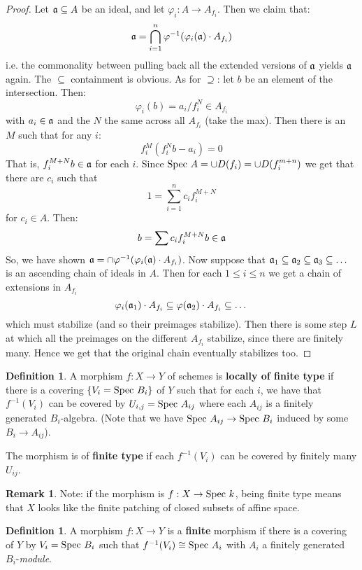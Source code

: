 \documentclass[10pt,reqno]{amsart}
\theoremstyle{definition}
\newtheorem{definition}[theorem]{Definition}
\newtheorem{remark}[theorem]{Remark}
\theoremstyle{remark}
\numberwithin{equation}{section}
\numberwithin{theorem}{section}
\newcommand{\spec}{\textup{Spec }}
\newcommand{\fraka}{\frak{a}}
\begin{document}
\begin{proof}
Let $\fraka \subseteq A$ be an ideal, and let $\varphi_i: A \to A_{f_i}$. Then we claim that:
\[\frak{a} = \bigcap_{i=1}^n \varphi^{-1}(\varphi_i(\fraka) \cdot A_{f_i}) \]
i.e. the commonality between pulling back all the extended versions of $\fraka$ yields $\fraka$ again. The $\subseteq$ containment is obvious. As for $\supseteq$: let $b$ be an element of the intersection. Then:
\[\varphi_i(b) = a_i/f_i^N \in A_{f_i}\]
with $a_i \in \fraka$ and the $N$ the same across all $A_{f_i}$ (take the max). Then there is an $M$ such that for any $i$:
\[f_i^M(f_i^Nb - a_i) = 0\]
That is, $f_i^{M+N}b \in \fraka$ for each $i$. Since $\spec A = \cup D(f_i) = \cup D(f_i^{m+n})$ we get that there are $c_i$ such that
\[1 = \sum_{i=1}^n c_i f_i^{M+N}\]
for $c_i \in A$. Then:
\[b = \sum c_i f^{M+N}_i b \in \fraka\]
So, we have shown $\frak{a} = \cap \varphi^{-1}(\varphi_i(\fraka) \cdot A_{f_i})$. Now suppose that $\fraka_1 \subseteq \fraka_2 \subseteq \fraka_3 \subseteq \dots$ is an ascending chain of ideals in $A$. Then for each $1 \le i \le n$ we get a chain of extensions in $A_{f_i}$
\[\varphi_i(\fraka_1) \cdot A_{f_i} \subseteq \varphi(\fraka_2) \cdot A_{f_i} \subseteq \dots\]
which must stabilize (and so their preimages stabilize). Then there is some step $L$ at which all the preimages on the different $A_{f_i}$ stabilize, since there are finitely many. Hence we get that the original chain eventually stabilizes too.
\end{proof}

\begin{definition} A morphism $f: X \to Y$ of schemes is \textbf{locally of finite type} if there is a covering $\{V_i = \spec B_i\}$ of $Y$ such that for each $i$, we have that $f^{-1}(V_i)$ can be covered by $U_{i,j} = \spec A_{ij}$ where each $A_{ij}$ is a finitely generated $B_i$-algebra. (Note that we have $\spec A_{ij} \to \spec B_i$ induced by some $B_i \to A_{ij}$).

The morphism is of \textbf{finite type} if each $f^{-1}(V_i)$ can be covered by finitely many $U_{ij}$. 
\end{definition}

\begin{remark} Note: if the morphism is $f: X \to \spec k$, being finite type means that $X$ looks like the finite patching of closed subsets of affine space.
\end{remark}

\begin{definition} A morphism $f: X \to Y$ is a \textbf{finite} morphism if there is a covering of $Y$ by $V_i = \spec B_i$ such that $f^{-1}(V_i) \cong \spec A_i$ with $A_i$ a finitely generated $B_i$-\textit{module}.
\end{definition}
\end{document}
